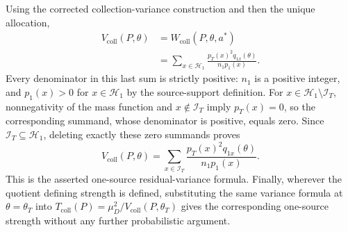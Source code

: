 Using the corrected collection-variance construction and then the unique allocation,
\[
\begin{aligned}
V_{\mathrm{coll}}(P,\theta)
&=W_{\mathrm{coll}}(P,\theta,a^*)\\
&=\sum_{x\in\mathcal H_1}
  \frac{p_T(x)^2q_{1x}(\theta)}{n_1p_1(x)}.
\end{aligned}
\]
Every denominator in this last sum is strictly positive: \(n_1\) is a positive integer, and \(p_1(x)>0\) for \(x\in\mathcal H_1\) by the source-support definition.  For \(x\in\mathcal H_1\setminus\mathcal I_T\), nonnegativity of the mass function and \(x\notin\mathcal I_T\) imply \(p_T(x)=0\), so the corresponding summand, whose denominator is positive, equals zero.  Since \(\mathcal I_T\subseteq\mathcal H_1\), deleting exactly these zero summands proves
\[
V_{\mathrm{coll}}(P,\theta)
=\sum_{x\in\mathcal I_T}
  \frac{p_T(x)^2q_{1x}(\theta)}{n_1p_1(x)}.
\]
This is the asserted one-source residual-variance formula.  Finally, wherever the quotient defining strength is defined, substituting the same variance formula at \(\theta=\theta_T\) into \(T_{\mathrm{coll}}(P)=\mu_D^2/V_{\mathrm{coll}}(P,\theta_T)\) gives the corresponding one-source strength without any further probabilistic argument.

